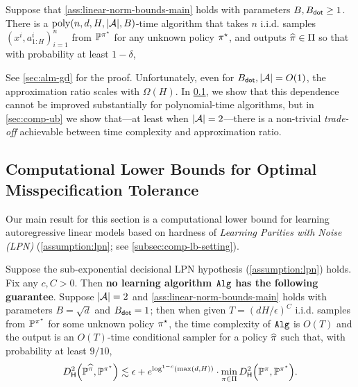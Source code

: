 \begin{proposition}\label{cor:linear-misspec-logloss}
  Suppose that \cref{ass:linear-norm-bounds-main} holds with parameters $B,B_{\mathsf{dot}}\geq 1$. There is a $\mathrm{poly}(n,d,H,|\mathcal{A}|,B)$-time algorithm that takes $n$ i.i.d. samples $(x^i,a^i_{1:H})_{i=1}^n$ from $\mathbb{P}^{\pi^{\star}}$ for any unknown policy $\pi^{\star}$, and outputs $\widehat{\pi}\in\Pi$ so that with probability at least $1-\delta$, %
\end{proposition}

See \cref{sec:alm-gd} for the proof. Unfortunately, even for $B_{\mathsf{dot}},|\mathcal{A}| = O(1)$, the approximation ratio scales with $\Omega(H)$. In \cref{sec:comp-lb}, we show that this dependence cannot be improved substantially for polynomial-time algorithms, but in \cref{sec:comp-ub} we show that---at least when $|\mathcal{A}| = 2$---there is a non-trivial \emph{trade-off} achievable between time complexity and approximation ratio.



\subsection{Computational Lower Bounds for Optimal Misspecification Tolerance}\label{sec:comp-lb}

Our main result for this section is a computational lower bound for learning autoregressive linear models based on hardness of \emph{Learning Parities with Noise (LPN)} (\cref{assumption:lpn}; see \cref{subsec:comp-lb-setting}).

\begin{theorem}\label{thm:comp-lb-main}
Suppose the sub-exponential decisional LPN hypothesis (\cref{assumption:lpn}) holds. Fix any $c,C>0$. Then \textbf{{no learning algorithm $\texttt{Alg}$ has the following guarantee}}. Suppose $|\mathcal{A}|=2$ and \cref{ass:linear-norm-bounds-main} holds with parameters $B=\sqrt{d}$ and $B_{\mathsf{dot}}=1$; then when given $T = (dH/\epsilon)^C$ i.i.d. samples from $\mathbb{P}^{\pi^{\star}}$ for some unknown policy $\pi^{\star}$, the time complexity of $\texttt{Alg}$ is $O(T)$ and the output is an $O(T)$-time conditional sampler for a policy $\widehat{\pi}$ such that, with probability at least $9/10$,
\[\Dhels{\BP^{\pihat}}{\BP^{\pistar}} \lesssim \epsilon + e^{\log^{1-c} (\max(d,H))} \cdot \min_{\pi \in \Pi} \Dhels{\BP^\pi}{\BP^{\pistar}}.\]
\end{theorem}


